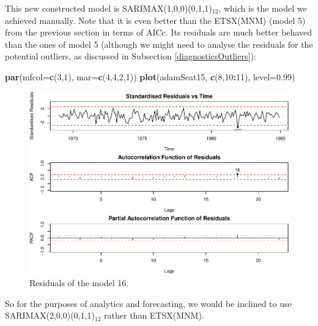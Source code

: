 \documentclass[]{book}
\newenvironment{Shaded}{\begin{snugshade}}{\end{snugshade}}
\newcommand{\DataTypeTok}[1]{\textcolor[rgb]{0.13,0.29,0.53}{#1}}
\newcommand{\DecValTok}[1]{\textcolor[rgb]{0.00,0.00,0.81}{#1}}
\newcommand{\FloatTok}[1]{\textcolor[rgb]{0.00,0.00,0.81}{#1}}
\newcommand{\KeywordTok}[1]{\textcolor[rgb]{0.13,0.29,0.53}{\textbf{#1}}}
\newcommand{\NormalTok}[1]{#1}
\newcommand{\OperatorTok}[1]{\textcolor[rgb]{0.81,0.36,0.00}{\textbf{#1}}}
\theoremstyle{definition}
\theoremstyle{definition}
\theoremstyle{definition}
\theoremstyle{definition}
\theoremstyle{remark}
\begin{document}
This new constructed model is SARIMAX(1,0,0)(0,1,1)\(_{12}\), which is the model we achieved manually. Note that it is even better than the ETSX(MNM) (model 5) from the previous section in terms of AICc. Its residuals are much better behaved than the ones of model 5 (although we might need to analyse the residuals for the potential outliers, as discussed in Subsection \ref{diagnosticsOutliers}):

\begin{Shaded}
\begin{Highlighting}[]
\KeywordTok{par}\NormalTok{(}\DataTypeTok{mfcol=}\KeywordTok{c}\NormalTok{(}\DecValTok{3}\NormalTok{,}\DecValTok{1}\NormalTok{), }\DataTypeTok{mar=}\KeywordTok{c}\NormalTok{(}\DecValTok{4}\NormalTok{,}\DecValTok{4}\NormalTok{,}\DecValTok{2}\NormalTok{,}\DecValTok{1}\NormalTok{))}
\KeywordTok{plot}\NormalTok{(adamSeat15, }\KeywordTok{c}\NormalTok{(}\DecValTok{8}\NormalTok{,}\DecValTok{10}\OperatorTok{:}\DecValTok{11}\NormalTok{), }\DataTypeTok{level=}\FloatTok{0.99}\NormalTok{)}
\end{Highlighting}
\end{Shaded}

\begin{figure}
\centering
\includegraphics{Svetunkov--2022----ADAM_files/figure-latex/adamSeat16Resid-1.pdf}
\caption{\label{fig:adamSeat16Resid}Residuals of the model 16.}
\end{figure}

So for the purposes of analytics and forecasting, we would be inclined to use SARIMAX(2,0,0)(0,1,1)\(_{12}\) rather than ETSX(MNM).
\end{document}
